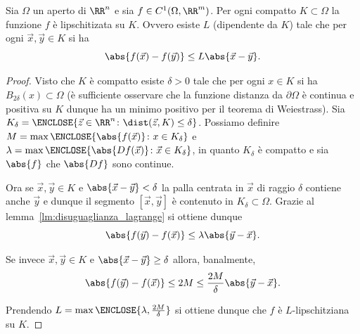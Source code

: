\begin{lemma}
  \label{lm:lipschitz_C1}
  Sia $\Omega$ un aperto di $\RR^n$ e sia $f\in C^1(\Omega,\RR^m)$.
  Per ogni compatto $K\subset \Omega$ 
  la funzione $f$ è lipschitizata su $K$.
  Ovvero esiste $L$ (dipendente da $K$)
  tale che
  per ogni $\vec x,\vec y \in K$ si ha
  \[
    \abs{f(\vec x) - f(\vec y)} \le L \abs{\vec x - \vec y}.
  \]
\end{lemma}
%
\begin{proof}
Visto che $K$ è compatto esiste $\delta>0$ 
tale che per ogni $x\in K$ si ha $B_{2\delta}(x)\subset \Omega$
(è sufficiente osservare che 
la funzione distanza da $\partial \Omega$ è continua e positiva su $K$
dunque ha un minimo positivo per il teorema di Weiestrass).
Sia $K_\delta = \ENCLOSE{\vec z\in \RR^n\colon \dist(\vec z, K) \le \delta}$.
Possiamo definire $M = \max\ENCLOSE{\abs{f(\vec x)}\colon x \in K_{\delta}}$
e $\lambda = \max\ENCLOSE{\abs{Df(\vec x)}\colon \vec x \in K_{\delta}}$,
in quanto $K_\delta$ è compatto e sia $\abs{f}$ che $\abs{Df}$ sono continue.

Ora se $\vec x,\vec y \in K$ e $\abs{\vec x - \vec y} < \delta$
la palla centrata in $\vec x$ di raggio $\delta$ contiene anche $\vec y$ e dunque
il segmento $[\vec x, \vec y]$ è contenuto in $K_\delta\subset \Omega$.
Grazie al lemma~\ref{lm:disuguaglianza_lagrange} si ottiene dunque 
\[
  \abs{f(\vec y) - f(\vec x)} \le \lambda \abs{\vec y - \vec x}.
\]

Se invece $\vec x,\vec y \in K$ e $\abs{\vec x - \vec y} \ge \delta$ allora,
banalmente,
\[
\abs{f(\vec y)-f(\vec x)}
\le 2 M 
\le \frac{2M}{\delta}\abs{\vec y - \vec x}.
\]

Prendendo $L = \max\ENCLOSE{\lambda, \frac{2M}{\delta}}$ 
si ottiene dunque che $f$ è $L$-lipschitziana 
su $K$.
\end{proof}


